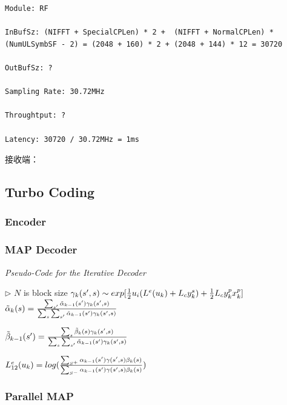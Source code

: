 \documentclass[titlepage]{article}
\numberwithin{figure}{section}
\numberwithin{equation}{section}
\begin{document}
\begin{verbatim}
Module: RF

InBufSz: (NIFFT + SpecialCPLen) * 2 +  (NIFFT + NormalCPLen) * (NumULSymbSF - 2) = (2048 + 160) * 2 + (2048 + 144) * 12 = 30720 

OutBufSz: ?

Sampling Rate: 30.72MHz

Throughtput: ?

Latency: 30720 / 30.72MHz = 1ms
\end{verbatim}

接收端：


\subsection{Turbo Coding}

\subsubsection{Encoder}

\subsubsection{MAP Decoder}

\textit{Pseudo-Code for the Iterative Decoder}

\begin{algorithm}[H]
	\begin{algorithmic}[1]
		 $\triangleright$ $N$ is block size
		\State $\gamma_{k}(s',s) \sim exp[{1\over 2}u_{i}(L^{e}(u_{k})+L_{c}y_{k}^{s})+{1\over 2}L_{c}y_{k}^{p}x_{k}^{p}]$
		\State $\tilde{\alpha}_{k}(s) = {{\sum_{s'}\tilde{\alpha}_{k-1}(s')\gamma_{k}(s',s)}\over {\sum_{s}\sum_{s'} \tilde{\alpha}_{k-1}(s')\gamma_{k}(s',s)}}$
		\EndFor

		\State $\tilde{\beta}_{k-1}(s') = {{\sum_{s}\tilde{\beta}_{k}(s)\gamma_{k}(s',s)}\over {\sum_{s}\sum_{s'} \tilde{\alpha}_{k-1}(s')\gamma_{k}(s',s)}}$
		\EndFor

		\State $L_{12}^{e}(u_{k}) = log({{\sum_{S^{+}} \alpha_{k-1}(s')\gamma(s',s)\beta_{k}(s)}\over {\sum_{S^{-}} \alpha_{k-1}(s')\gamma(s',s)\beta_{k}(s)}})$
		\EndFor
\end{algorithmic}
\end{algorithm}

\subsubsection{Parallel MAP}
\end{document}
